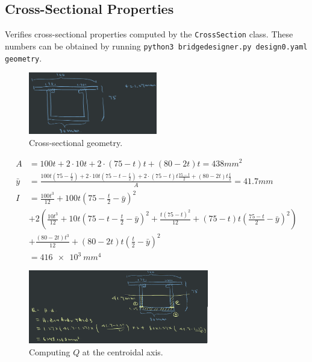 \documentclass{article}
\begin{document}
\subsection{Cross-Sectional Properties}

Verifies cross-sectional properties computed by the \texttt{CrossSection} class.
These numbers can be obtained by running \texttt{python3 bridgedesigner.py design0.yaml geometry}.

\begin{figure}[h]
    \centering
    \includegraphics[width=0.5\textwidth]{cs.png}
    \caption{Cross-sectional geometry.}
\end{figure}

\begin{align*}
    A &= 100t + 2 \cdot 10t + 2 \cdot (75 - t)t + (80 - 2t)t = 438\si{mm^2} \\
    \bar{y} &= \frac{100t\left(75 - \frac{t}{2}\right) + 2 \cdot 10t(75 - t - \frac{t}{2}) + 2 \cdot (75 - t)t\frac{75 - t}{2} + (80 - 2t)t\frac{t}{2}}{A} = 41.7\si{mm}\\
    I &= \frac{100t^3}{12} + 100t\left(75 - \frac{t}{2} - \bar{y}\right)^2 \\
        & + 2\left(\frac{10t^3}{12} + 10t\left(75 - t - \frac{t}{2} - \bar{y}\right)^2 + \frac{t(75 - t)^2}{12} + (75 - t)t\left(\frac{75 - t}{2} - \bar{y}\right)^2\right) \\
        &+ \frac{(80 - 2t)t^3}{12} + (80 - 2t)t\left(\frac{t}{2} - \bar{y}\right)^2 \\
      &= \SI{416e3}{mm^4}
\end{align*}

\begin{figure}[h]
    \centering
    \includegraphics[width=0.7\textwidth]{qcent.png}
    \caption{Computing \(Q\) at the centroidal axis.}
\end{figure}
\end{document}

